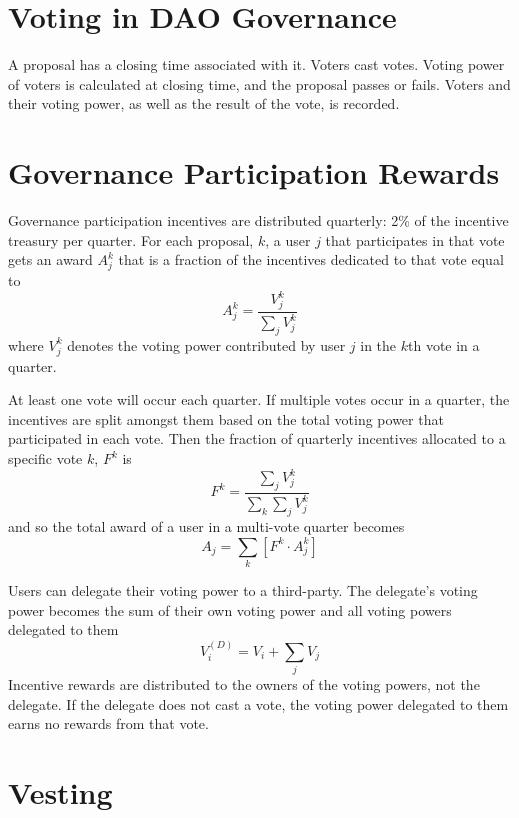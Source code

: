 \documentclass{article}
\begin{document}
\section{Voting in DAO Governance}\label{sec:voting}

A proposal has a closing time associated with it.
Voters cast votes.
Voting power of voters is calculated at closing time, and the proposal passes or fails.
Voters and their voting power, as well as the result of the vote, is recorded.

\section{Governance Participation Rewards}\label{sec:rewards}

Governance participation incentives are distributed quarterly: 2\% of the incentive treasury per quarter.
For each proposal, $k$, a user $j$ that participates in that vote gets an award $A^{k}_j$ that is a fraction of the incentives dedicated to that vote equal to
\begin{equation}
A^{k}_j = \frac{V^{k}_j}{\sum_j V^{k}_j}
\end{equation}
where $V^{k}_j$ denotes the voting power contributed by user $j$ in the $k$th vote in a quarter.

At least one vote will occur each quarter.
If multiple votes occur in a quarter, the incentives are split amongst them based on the total voting power that participated in each vote.
Then the fraction of quarterly incentives allocated to a specific vote $k$, $F^{k}$ is
\begin{equation}
F^{k} = \frac{\sum_j V^{k}_j}{\sum_k \sum_j V^{k}_j}
\end{equation}
and so the total award of a user in a multi-vote quarter becomes
\begin{equation}
A_j = \sum_k \left[F^{k} \cdot A^{k}_j\right]
\end{equation}

Users can delegate their voting power to a third-party.
The delegate's voting power becomes the sum of their own voting power and all voting powers delegated to them
\begin{equation}
V^{(D)}_i = V_i + \sum_j V_j
\end{equation}
Incentive rewards are distributed to the owners of the voting powers, not the delegate.
If the delegate does not cast a vote, the voting power delegated to them earns no rewards from that vote.

\section{Vesting}\label{sec:vesting}
\end{document}
